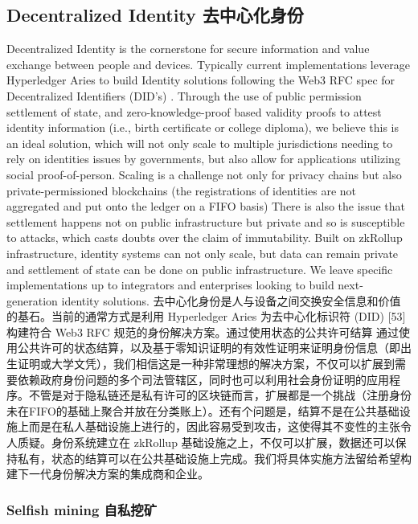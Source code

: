 \documentclass{ctexart}
\begin{document}
\subsection{Decentralized Identity 去中心化身份}
Decentralized Identity is the cornerstone for secure information and value exchange between people and devices. Typically current implementations leverage Hyperledger Aries to build Identity solutions following the Web3 RFC spec for Decentralized Identifiers (DID's) \cite{DID}. Through the use of public permission settlement of state, and zero-knowledge-proof based validity proofs to attest identity information (i.e., birth certificate or college diploma), we believe this is an ideal solution, which will not only scale to multiple jurisdictions needing to rely on identities issues by governments, but also allow for applications utilizing  social proof-of-person. Scaling is a challenge not only for privacy chains but also private-permissioned blockchains (the registrations of identities are not aggregated and put onto the ledger on a FIFO basis) There is also the issue that settlement happens not on public infrastructure but private and so is susceptible to attacks, which casts doubts over the claim of immutability. Built on zkRollup infrastructure, identity systems can not only scale, but data can remain private and settlement of state can be done on public infrastructure. We leave specific implementations up to integrators and enterprises looking to build next-generation identity solutions. 去中心化身份是人与设备之间交换安全信息和价值的基石。当前的通常方式是利用 Hyperledger Aries 为去中心化标识符 (DID) [53] 构建符合 Web3 RFC 规范的身份解决方案。通过使用状态的公共许可结算 通过使用公共许可的状态结算，以及基于零知识证明的有效性证明来证明身份信息（即出生证明或大学文凭），我们相信这是一种非常理想的解决方案，不仅可以扩展到需要依赖政府身份问题的多个司法管辖区，同时也可以利用社会身份证明的应用程序。不管是对于隐私链还是私有许可的区块链而言，扩展都是一个挑战（注册身份未在FIFO的基础上聚合并放在分类账上）。还有个问题是，结算不是在公共基础设施上而是在私人基础设施上进行的，因此容易受到攻击，这使得其不变性的主张令人质疑。身份系统建立在 zkRollup 基础设施之上，不仅可以扩展，数据还可以保持私有，状态的结算可以在公共基础设施上完成。我们将具体实施方法留给希望构建下一代身份解决方案的集成商和企业。

\subsubsection{Selfish mining 自私挖矿}
\end{document}
